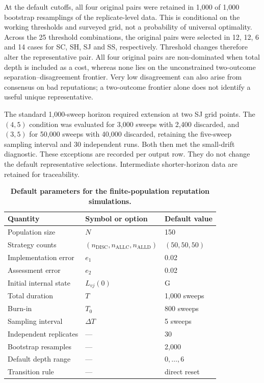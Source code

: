 \documentclass[fleqn,10pt]{wlscirep}
\begin{document}
At the default cutoffs, all four original pairs were retained in 1,000 of 1,000 bootstrap resamplings of the replicate-level data. This is conditional on the working thresholds and surveyed grid, not a probability of universal optimality. Across the 25 threshold combinations, the original pairs were selected in 12, 12, 6 and 14 cases for SC, SH, SJ and SS, respectively. Threshold changes therefore alter the representative pair. All four original pairs are non-dominated when total depth is included as a cost, whereas none lies on the unconstrained two-outcome separation--disagreement frontier. Very low disagreement can also arise from consensus on bad reputations; a two-outcome frontier alone does not identify a useful unique representative.

The standard 1,000-sweep horizon required extension at two SJ grid points. The $(4,5)$ condition was evaluated for 3,000 sweeps with 2,400 discarded, and $(3,5)$ for 50,000 sweeps with 40,000 discarded, retaining the five-sweep sampling interval and 30 independent runs. Both then met the small-drift diagnostic. These exceptions are recorded per output row. They do not change the default representative selections. Intermediate shorter-horizon data are retained for traceability.

\begin{table}[htbp]
\centering
\caption{\textbf{Default parameters for the finite-population reputation simulations.}}
\label{tab:si-finite-simulation-parameters}
\begin{tabular}{lll}
\toprule
Quantity & Symbol or option & Default value\\
\midrule
Population size & $N$ & 150\\
Strategy counts & $(n_{\mathrm{DISC}},n_{\mathrm{ALLC}},n_{\mathrm{ALLD}})$ & $(50,50,50)$\\
Implementation error & $e_1$ & 0.02\\
Assessment error & $e_2$ & 0.02\\
Initial internal state & $L_{vj}(0)$ & $\mathrm G$\\
Total duration & $T$ & 1,000 sweeps\\
Burn-in & $T_0$ & 800 sweeps\\
Sampling interval & $\Delta T$ & 5 sweeps\\
Independent replicates & --- & 30\\
Bootstrap resamples & --- & 2,000\\
Default depth range & --- & $0,\ldots,6$\\
Transition rule & --- & direct reset\\
\bottomrule
\end{tabular}
\end{table}
\end{document}
